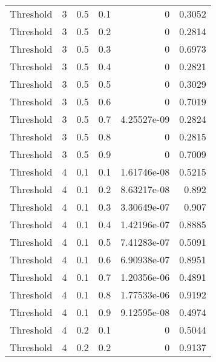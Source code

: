 \documentclass{article}
\begin{document}
\begin{longtable}[H]{lrrrrr}
 Threshold      &       3 &   0.5 &            0.1 &      0           &          0.3052 \\
 Threshold      &       3 &   0.5 &            0.2 &      0           &          0.2814 \\
 Threshold      &       3 &   0.5 &            0.3 &      0           &          0.6973 \\
 Threshold      &       3 &   0.5 &            0.4 &      0           &          0.2821 \\
 Threshold      &       3 &   0.5 &            0.5 &      0           &          0.3029 \\
 Threshold      &       3 &   0.5 &            0.6 &      0           &          0.7019 \\
 Threshold      &       3 &   0.5 &            0.7 &      4.25527e-09 &          0.2824 \\
 Threshold      &       3 &   0.5 &            0.8 &      0           &          0.2815 \\
 Threshold      &       3 &   0.5 &            0.9 &      0           &          0.7009 \\
 Threshold      &       4 &   0.1 &            0.1 &      1.61746e-08 &          0.5215 \\
 Threshold      &       4 &   0.1 &            0.2 &      8.63217e-08 &          0.892  \\
 Threshold      &       4 &   0.1 &            0.3 &      3.30649e-07 &          0.907  \\
 Threshold      &       4 &   0.1 &            0.4 &      1.42196e-07 &          0.8885 \\
 Threshold      &       4 &   0.1 &            0.5 &      7.41283e-07 &          0.5091 \\
 Threshold      &       4 &   0.1 &            0.6 &      6.90938e-07 &          0.8951 \\
 Threshold      &       4 &   0.1 &            0.7 &      1.20356e-06 &          0.4891 \\
 Threshold      &       4 &   0.1 &            0.8 &      1.77533e-06 &          0.9192 \\
 Threshold      &       4 &   0.1 &            0.9 &      9.12595e-08 &          0.4974 \\
 Threshold      &       4 &   0.2 &            0.1 &      0           &          0.5044 \\
 Threshold      &       4 &   0.2 &            0.2 &      0           &          0.9137 \\

\end{longtable}
\end{document}

